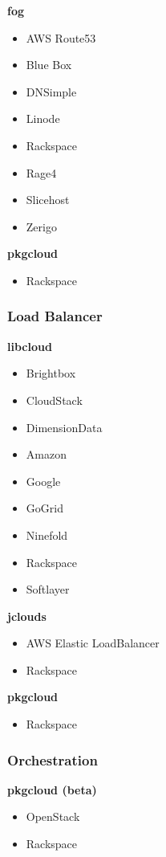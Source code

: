 \documentclass[11pt]{scrartcl}
\begin{document}
\textbf{fog}
\begin{itemize}
\item AWS Route53
\item Blue Box
\item DNSimple
\item Linode
\item Rackspace
\item Rage4
\item Slicehost
\item Zerigo
\end{itemize}

\textbf{pkgcloud}
\begin{itemize}
\item Rackspace
\end{itemize}

\subsubsection{Load Balancer}
\textbf{libcloud}
\begin{itemize}
\item Brightbox
\item CloudStack
\item DimensionData
\item Amazon
\item Google
\item GoGrid
\item Ninefold
\item Rackspace
\item Softlayer
\end{itemize}

\textbf{jclouds}
\begin{itemize}
\item AWS Elastic LoadBalancer
\item Rackspace
\end{itemize}

\textbf{pkgcloud}
\begin{itemize}
\item Rackspace
\end{itemize}

\subsubsection{Orchestration}
\textbf{pkgcloud (beta)}
\begin{itemize}
\item OpenStack
\item Rackspace
\end{itemize}
\end{document}
